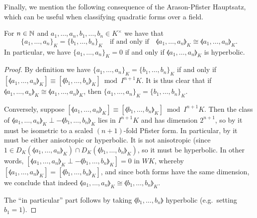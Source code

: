\documentclass[12pt, leqno, british]{amsart}
\begin{document}
Finally, we mention the following consequence of the Arason-Pfister Hauptsatz, which can be useful when classifying quadratic forms over a field.
\begin{prop}\label{P:symb-equal}
For $n \in \mathbb N$ and $a_1, \ldots, a_n, b_1, \ldots, b_n \in K^\times$ we have that
$$ \lbrace a_1, \ldots, a_n \rbrace_K = \lbrace b_1, \ldots, b_n \rbrace_K \quad\text{if and only if}\quad \llangle a_1, \ldots, a_n \rrangle_K \cong \llangle a_1, \ldots, a_n \rrangle_K.$$
In particular, we have $\lbrace a_1, \ldots, a_n \rbrace_K = 0$ if and only if $\llangle a_1, \ldots, a_n \rrangle_K$ is hyperbolic.
\end{prop}
\begin{proof}
By definition we have $\lbrace a_1, \ldots, a_n \rbrace_K = \lbrace b_1, \ldots, b_n \rbrace_K$ if and only if $[\llangle a_1, \ldots, a_n \rrangle_K] \equiv [\llangle b_1, \ldots, b_n \rrangle_K] \bmod I^{n+1}K$.
It is thus clear that if $\llangle a_1, \ldots, a_n \rrangle_K \cong \llangle a_1, \ldots, a_n \rrangle_K$, then $\lbrace a_1, \ldots, a_n \rbrace_K = \lbrace b_1, \ldots, b_n \rbrace_K$.

Conversely, suppose $[\llangle a_1, \ldots, a_n \rrangle_K] \equiv [\llangle b_1, \ldots, b_n \rrangle_K] \bmod I^{n+1}K$.
Then the class of $\llangle a_1, \ldots, a_n \rrangle_K \perp -\llangle b_1, \ldots, b_n \rrangle_K$ lies in $I^{n+1}K$ and has dimension $2^{n+1}$, so by  it must be isometric to a scaled $(n+1)$-fold Pfister form.
In particular, by  it must be either anisotropic or hyperbolic.
It is not anisotropic (since $1 \in D_K(\llangle a_1, \ldots, a_n \rrangle_K) \cap D_K(\llangle b_1, \ldots, b_n \rrangle_K)$, so it must be hyperbolic.
In other words, $[\llangle a_1, \ldots, a_n \rrangle_K \perp -\llangle b_1, \ldots, b_n \rrangle_K] = 0$ in $WK$, whereby $[\llangle a_1, \ldots, a_n \rrangle_K] = [\llangle b_1, \ldots, b_n \rrangle_K]$, and since both forms have the same dimension, we conclude that indeed $\llangle a_1, \ldots, a_n \rrangle_K \cong \llangle b_1, \ldots, b_n \rrangle_K$.

The ``in particular'' part follows by taking $\llangle b_1, \ldots, b_n \rrangle$ hyperbolic (e.g.~setting $b_1 = 1$).
\end{proof}
\end{document}
